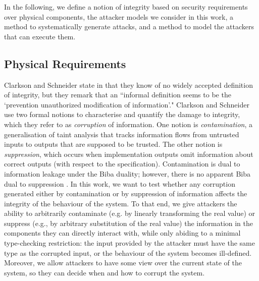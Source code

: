 In the following, we define a notion of integrity based on security requirements over physical components, the attacker models we consider in this work, a method to systematically generate attacks, and a method to model the attackers that can execute them. 

\subsection{Physical Requirements}{
{\color{blue}
Clarkson and Schneider state in \cite{QuantitativeIntegrity} that they know of no widely accepted definition of integrity, but they remark that an ``informal definition seems to be the `prevention unauthorized modification of information'." Clarkson and Schneider use two formal notions to characterise and quantify the {damage to integrity}, which they refer to as \emph{corruption} of information. One notion is \emph{contamination}, a generalisation of taint analysis that tracks information flows from untrusted inputs to outputs that are supposed to be trusted. The other notion is \emph{suppression}, which occurs when implementation outputs omit information about correct outputs (with respect to the specification). Contamination is dual to information leakage under the Biba duality; however, there is no apparent Biba dual to suppression \cite{BibaIntegrity}. 
}
In this work, we want to test whether any corruption generated either by contamination or by suppression of information affects the integrity of the behaviour of the system. To that end, we %
give attackers the ability to arbitrarily contaminate (e.g. by linearly transforming the real value) or suppress (e.g., by arbitrary substitution of the real value) the information in the components they can directly interact with, while only abiding to a minimal type-checking restriction: the input provided by the attacker must have the same type as the corrupted input, or the behaviour of the system becomes ill-defined. Moreover, we allow attackers to have some view over the current state of the system, so they can decide when and how to corrupt the system.

}
